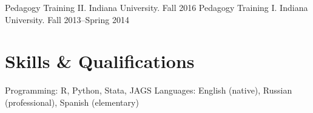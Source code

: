 \documentclass[11pt,]{article}
\begin{document}
Pedagogy Training II. Indiana University. \hfill Fall 2016 \newline
Pedagogy Training I. Indiana University. \hfill Fall 2013--Spring 2014

\hypertarget{skills-qualifications}{%
\section{Skills \& Qualifications}\label{skills-qualifications}}

Programming: \textsf{R}, Python, Stata, JAGS \hfill \newline Languages:
English (native), Russian (professional), Spanish (elementary)
\end{document}
